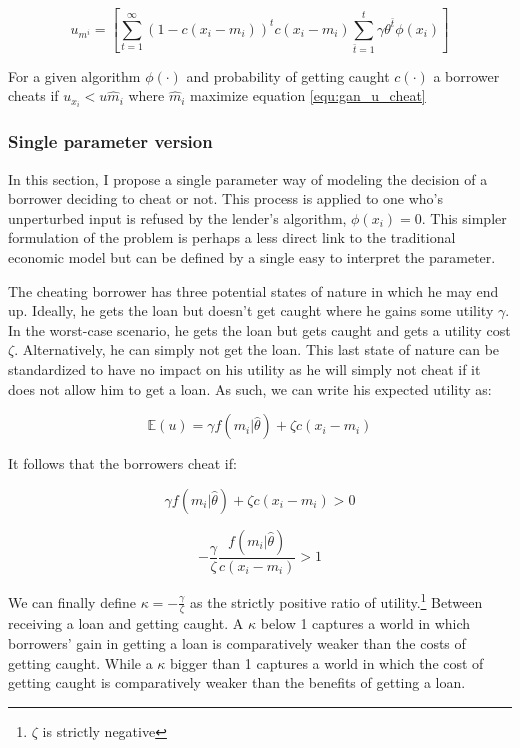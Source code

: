 \documentclass[12pt]{article} %
\begin{document}
\begin{equation} \label{equ:gan_u_cheat}
u_{m^{i}} = \left[
\sum_{t=1}^{\infty} (1-c(x_i-m_i))^tc(x_i-m_i) 
 \sum_{\bar{t}=1}^{t} \gamma \theta^{\bar{t}} \phi(x_i) 
 \right]
\end{equation}

For a given algorithm $\phi(\cdot)$ and probability of getting caught $c(\cdot)$ a borrower cheats if $u_{x_i}<u{\hat{m}_i}$ where $\hat{m}_i$ maximize equation \ref{equ:gan_u_cheat}

\subsubsection{Single parameter version}
In this section, I propose a single parameter way of modeling the decision of a borrower deciding to cheat or not. This process is applied to one who's unperturbed input is refused by the lender's algorithm, $\phi(x_i)=0$. This simpler formulation of the problem is perhaps a less direct link to the traditional economic model but can be defined by a single easy to interpret the parameter.

The cheating borrower has three potential states of nature in which he may end up. Ideally, he gets the loan but doesn't get caught where he gains some utility $\gamma$. In the worst-case scenario, he gets the loan but gets caught and gets a utility cost $\zeta$. Alternatively, he can simply not get the loan. This last state of nature can be standardized to have no impact on his utility as he will simply not cheat if it does not allow him to get a loan. As such, we can write his expected utility as:

\begin{equation}
\mathbb{E}(u) = \gamma f(m_i|\hat{\theta}) + \zeta c(x_i-m_i)
\end{equation}

It follows that the borrowers cheat if: 

\begin{equation}
\gamma f(m_i|\hat{\theta}) + \zeta c(x_i-m_i) > 0
\end{equation}


\begin{equation}
-\frac{\gamma}{\zeta} \frac{f(m_i|\hat{\theta})}{c(x_i-m_i)} > 1
\end{equation}

We can finally define $\kappa = -\frac{\gamma}{\zeta}$ as the strictly positive ratio of utility.\footnote{$\zeta$ is strictly negative} Between receiving a loan and getting caught. A $\kappa$ below 1 captures a world in which borrowers' gain in getting a loan is comparatively weaker than the costs of getting caught. While a $\kappa$ bigger than 1 captures a world in which the cost of getting caught is comparatively weaker than the benefits of getting a loan. 
\end{document}
